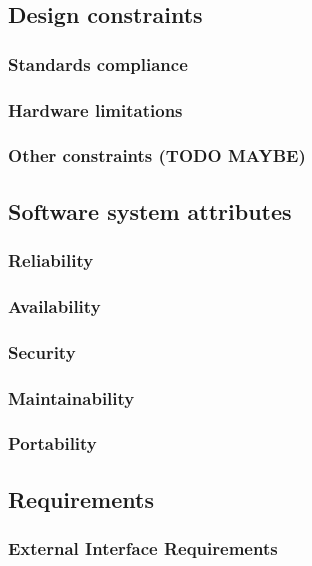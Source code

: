 \subsection{Design constraints}
\subsubsection{Standards compliance}
\subsubsection{Hardware limitations}
\subsubsection{Other constraints (TODO MAYBE)}

\subsection{Software system attributes}
\subsubsection{Reliability}
\subsubsection{Availability}
\subsubsection{Security}
\subsubsection{Maintainability}
\subsubsection{Portability}
\subsection{Requirements}
\subsubsection{External Interface Requirements}
\clearpage